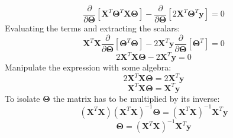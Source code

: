 \documentclass[a4paper,12pt]{article}
\begin{document}
\[\frac{\partial}{\partial\boldsymbol{\Theta}}[\boldsymbol{X}^T\boldsymbol{\Theta}^T\boldsymbol{X\Theta}] - \frac{\partial}{\partial\boldsymbol{\Theta}}[2\boldsymbol{X}^T\boldsymbol{\Theta}^T\boldsymbol{y}] = 0\]
Evaluating the terms and extracting the scalars:
\[\boldsymbol{X}^T\boldsymbol{X}\frac{\partial}{\partial\boldsymbol{\Theta}}[\boldsymbol{\Theta}^T\boldsymbol{\Theta}] - 2\boldsymbol{X}^T\boldsymbol{y}\frac{\partial}{\partial\boldsymbol{\Theta}}[\boldsymbol{\Theta}^T] = 0 \]
\[2\boldsymbol{X}^T\boldsymbol{X\Theta} - 2\boldsymbol{X}^T\boldsymbol{y} = 0\]
Manipulate the expression with some algebra:
\[2\boldsymbol{X}^T\boldsymbol{X\Theta} = 2\boldsymbol{X}^T\boldsymbol{y}\]
\[\boldsymbol{X}^T\boldsymbol{X\Theta} = \boldsymbol{X}^T\boldsymbol{y}\]
To isolate $\boldsymbol{\Theta}$ the matrix has to be multiplied by its inverse:
\[(\boldsymbol{X}^T\boldsymbol{X})(\boldsymbol{X}^T\boldsymbol{X})^{-1}\boldsymbol{\Theta} = (\boldsymbol{X}^T\boldsymbol{X})^{-1}\boldsymbol{X}^T\boldsymbol{y}\]
\[\boldsymbol{\Theta} = (\boldsymbol{X}^T\boldsymbol{X})^{-1}\boldsymbol{X}^T\boldsymbol{y}\]
\end{document}
